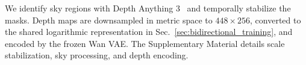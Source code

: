 We identify sky regions with Depth Anything 3~\cite{lin2025depthanything3} and temporally stabilize the masks.
Depth maps are downsampled in metric space to $448\!\times\!256$, converted to the shared logarithmic representation in Sec.~\ref{sec:bidirectional_training}, and encoded by the frozen Wan VAE.
The Supplementary Material details scale stabilization, sky processing, and depth encoding.

